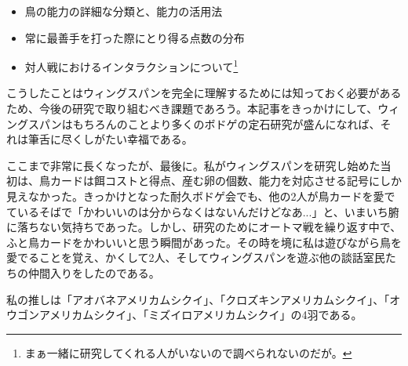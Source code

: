 \begin{multicols}{2}
\begin{itemize}
  \item 鳥の能力の詳細な分類と、能力の活用法
  \item 常に最善手を打った際にとり得る点数の分布
  \item 対人戦におけるインタラクションについて\footnote{まぁ一緒に研究してくれる人がいないので調べられないのだが。}
\end{itemize}
こうしたことはウィングスパンを完全に理解するためには知っておく必要があるため、今後の研究で取り組むべき課題であろう。本記事をきっかけにして、ウィングスパンはもちろんのことより多くのボドゲの定石研究が盛んになれば、それは筆舌に尽くしがたい幸福である。
\par
ここまで非常に長くなったが、最後に。私がウィングスパンを研究し始めた当初は、鳥カードは餌コストと得点、産む卵の個数、能力を対応させる記号にしか見えなかった。きっかけとなった耐久ボドゲ会でも、他の2人が鳥カードを愛でているそばで「かわいいのは分からなくはないんだけどなあ...」と、いまいち腑に落ちない気持ちであった。しかし、研究のためにオートマ戦を繰り返す中で、ふと鳥カードをかわいいと思う瞬間があった。その時を境に私は遊びながら鳥を愛でることを覚え、かくして2人、そしてウィングスパンを遊ぶ他の談話室民たちの仲間入りをしたのである。
\par
私の推しは「アオバネアメリカムシクイ」、「クロズキンアメリカムシクイ」、「オウゴンアメリカムシクイ」、「ミズイロアメリカムシクイ」の4羽である。
\end{multicols}

